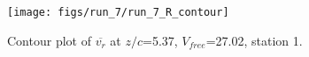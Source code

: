 \begin{figure}[H]
\centering
\texttt{[image: figs/run\_7/run\_7\_R\_contour]}
\caption{Contour plot of $\overline{v_{r}}$ at $z/c$=5.37, $V_{free}$=27.02, station 1.}
\label{fig:run_7_R_contour}
\end{figure}


